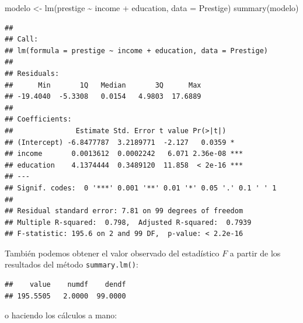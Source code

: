 \documentclass[
]{book}
\newenvironment{Shaded}{\begin{snugshade}}{\end{snugshade}}
\newcommand{\AttributeTok}[1]{\textcolor[rgb]{0.77,0.63,0.00}{#1}}
\newcommand{\CommentTok}[1]{\textcolor[rgb]{0.56,0.35,0.01}{\textit{#1}}}
\newcommand{\DecValTok}[1]{\textcolor[rgb]{0.00,0.00,0.81}{#1}}
\newcommand{\FunctionTok}[1]{\textcolor[rgb]{0.00,0.00,0.00}{#1}}
\newcommand{\NormalTok}[1]{#1}
\newcommand{\OtherTok}[1]{\textcolor[rgb]{0.56,0.35,0.01}{#1}}
\newcommand{\SpecialCharTok}[1]{\textcolor[rgb]{0.00,0.00,0.00}{#1}}
\theoremstyle{break}
\theoremstyle{nonumberplain}
\renewcommand{\CommentTok}[1]{\textcolor[rgb]{0.41,0.41,0.41}{\texttt{#1}}}
\begin{document}
\begin{Shaded}
\begin{Highlighting}[]
\NormalTok{modelo }\OtherTok{\textless{}{-}} \FunctionTok{lm}\NormalTok{(prestige }\SpecialCharTok{\textasciitilde{}}\NormalTok{ income }\SpecialCharTok{+}\NormalTok{ education, }\AttributeTok{data =}\NormalTok{ Prestige)}
\FunctionTok{summary}\NormalTok{(modelo)}
\end{Highlighting}
\end{Shaded}

\begin{verbatim}
## 
## Call:
## lm(formula = prestige ~ income + education, data = Prestige)
## 
## Residuals:
##      Min       1Q   Median       3Q      Max 
## -19.4040  -5.3308   0.0154   4.9803  17.6889 
## 
## Coefficients:
##               Estimate Std. Error t value Pr(>|t|)    
## (Intercept) -6.8477787  3.2189771  -2.127   0.0359 *  
## income       0.0013612  0.0002242   6.071 2.36e-08 ***
## education    4.1374444  0.3489120  11.858  < 2e-16 ***
## ---
## Signif. codes:  0 '***' 0.001 '**' 0.01 '*' 0.05 '.' 0.1 ' ' 1
## 
## Residual standard error: 7.81 on 99 degrees of freedom
## Multiple R-squared:  0.798,  Adjusted R-squared:  0.7939 
## F-statistic: 195.6 on 2 and 99 DF,  p-value: < 2.2e-16
\end{verbatim}

También podemos obtener el valor observado del estadístico \(F\)
a partir de los resultados del método \texttt{summary.lm()}:

\begin{Shaded}
\end{Shaded}

\begin{verbatim}
##    value    numdf    dendf 
## 195.5505   2.0000  99.0000
\end{verbatim}

o haciendo los cálculos a mano:
\end{document}
